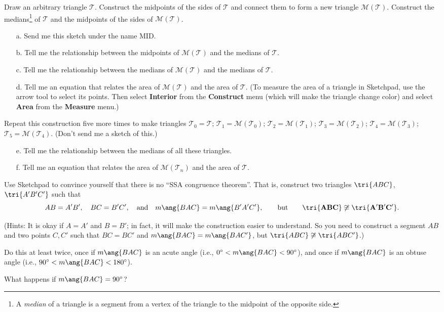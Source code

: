 \begin{SA}
\newcommand{\MM}{{\mathcal M}}
\newcommand{\TT}{{\mathcal T}}
Draw an arbitrary triangle $\TT$.  Construct the midpoints
of the sides of $\mathcal{T}$ and connect them to form a new triangle
$\MM(\TT)$.  Construct the medians\footnote{A \emph{median} of a triangle
is a segment from a vertex of the triangle to the midpoint of the opposite side.} of $\TT$ and the midpoints of the sides of $\MM(\TT)$.
\begin{itemize}
\item[a.] Send me this sketch under the name MID.
\item[b.] Tell me the relationship between the midpoints of $\MM(\TT)$ and the
medians of $\TT$.
\item[c.] Tell me the relationship between the medians of $\MM(\TT)$ and the
medians of $\TT$.
\item[d.] Tell me an equation that relates the area of $\MM(\TT)$ and the
area of $\TT$.  (To measure the area of a triangle in Sketchpad, use the arrow tool to select its points.  Then select \textbf{Interior} from the \textbf{Construct} menu (which will make the triangle change color) and select \textbf{Area} from the \textbf{Measure} menu.)
\end{itemize}
Repeat this construction five more times to make triangles $\TT_0 = \TT$; $\TT_1 =\MM(\TT_0)$; $\TT_2 =\MM(\TT_1)$; $\TT_3 =\MM(\TT_2)$; $\TT_4 =\MM(\TT_3)$; $\TT_5 =\MM(\TT_4)$.  (Don't send me a sketch of this.)
\begin{itemize}
\item[e.] Tell me the relationship between the medians of all these triangles.
\item[f.] Tell me an equation that relates the area of $\MM(\TT_n)$ and the area of $\TT$.
\end{itemize}
\end{SA}

\begin{SA}
Use Sketchpad to convince yourself that there is no ``SSA congruence theorem''.
That is, construct two triangles $\tri{ABC}$, $\tri{A'B'C'}$ such that
  $$AB=A'B',\quad BC=B'C', \quad\text{and}\quad m\ang{BAC}=m\ang{B'A'C'},
  \qquad\text{but}\qquad
  \mathbf{\tri{ABC}\not\cong\tri{A'B'C'}.}$$

(Hints: It is okay if $A=A'$ and $B=B'$; in fact, it will make 
the construction easier to understand.  So you need to construct a segment
$AB$ and two points $C,C'$ such that $BC=BC'$ and $m\ang{BAC}=m\ang{BAC'}$,
but $\tri{ABC}\not\cong\tri{ABC'}$.)

Do this at least twice, once if $m\ang{BAC}$ is an acute angle (i.e.,
$0^\circ<m\ang{BAC}<90^\circ$), and once if $m\ang{BAC}$
is an obtuse angle (i.e., $90^\circ<m\ang{BAC}<180^\circ$).

What happens if $m\ang{BAC}=90^\circ$?
\end{SA}



